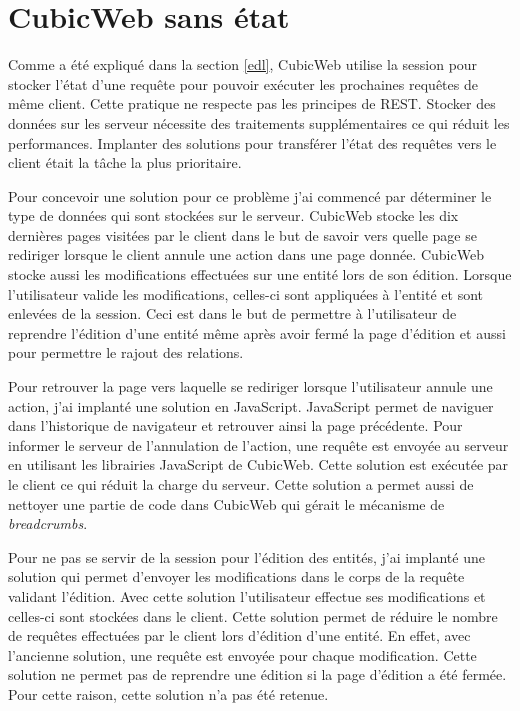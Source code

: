 \section{CubicWeb sans état}
Comme a été expliqué dans la section \ref{edl}, CubicWeb utilise la session pour stocker l'état d'une requête pour pouvoir exécuter les prochaines requêtes de même client. Cette pratique ne respecte pas les principes de REST. Stocker des données sur les serveur nécessite des traitements supplémentaires ce qui réduit les performances. Implanter des solutions pour transférer l'état des requêtes vers le client était la tâche la plus prioritaire.

Pour concevoir une solution pour ce problème j'ai commencé par déterminer le type de données qui sont stockées sur le serveur. CubicWeb stocke les dix dernières pages visitées par le client dans le but de savoir vers quelle page se rediriger lorsque le client annule une action dans une page donnée. CubicWeb stocke aussi les modifications effectuées sur une entité lors de son édition. Lorsque l'utilisateur valide les modifications, celles-ci sont appliquées à l'entité et sont enlevées de la session. Ceci est dans le but de permettre à l'utilisateur de reprendre l'édition d'une entité même après avoir fermé la page d'édition et aussi pour permettre le rajout des relations. 

Pour retrouver la page vers laquelle se rediriger lorsque l'utilisateur annule une action, j'ai implanté une solution en JavaScript. JavaScript permet de naviguer dans l'historique de navigateur et retrouver ainsi la page précédente. Pour informer le serveur de l'annulation de l'action, une requête  est envoyée au serveur en utilisant les librairies JavaScript de CubicWeb. Cette solution est exécutée par le client ce qui réduit la charge du serveur. Cette solution a permet aussi de nettoyer une partie de code dans CubicWeb qui gérait le mécanisme de \textit{breadcrumbs}.

Pour ne pas se servir de la session pour l'édition des entités, j'ai implanté une solution qui permet d'envoyer les modifications dans le corps de la requête validant l'édition. Avec cette solution l'utilisateur effectue ses modifications et celles-ci sont stockées dans le client. Cette solution permet de réduire le nombre de requêtes effectuées par le client lors d'édition d'une entité. En effet, avec l'ancienne solution, une requête est envoyée pour chaque modification. Cette solution ne permet pas de reprendre une édition si la page d'édition a été fermée. Pour cette raison, cette solution n'a pas été retenue.

